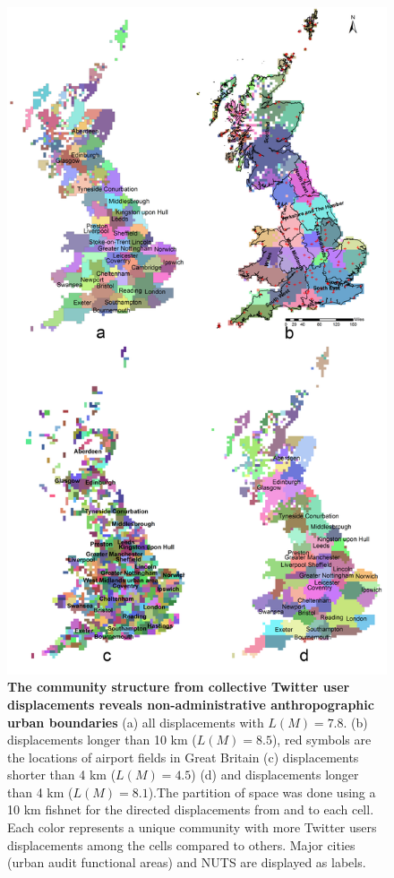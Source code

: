 \documentclass[]{tGIS2e}
\begin{document}
\begin{figure}
\begin{center}
\includegraphics[width=0.85\linewidth]{./figure/S5_community}
\caption{{\bf The community structure from collective Twitter user displacements reveals non-administrative anthropographic urban boundaries} (a) all displacements with $L(M)= 7.8$. (b) displacements longer than 10 km ($L(M)=8.5$), red symbols are the locations of airport fields in Great Britain (c) displacements shorter than 4 km ($L(M)=4.5$) (d) and displacements longer than 4 km ($L(M)=8.1$).The partition of space was done using a 10 km fishnet for the directed displacements from and to each cell. Each color represents a unique community with more Twitter users displacements among the cells compared to others. Major cities (urban audit functional areas) and NUTS are displayed as labels.}
\label{S5_Fig}
\end{center}
\end{figure}
\end{document}
